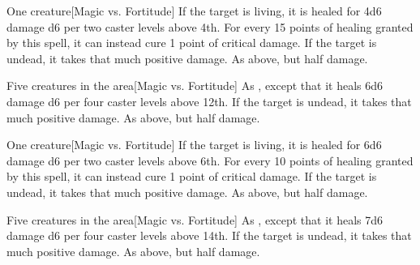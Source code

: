 \spellrng{\rngclose}
\begin{spelltarget}{One creature}[Magic vs. Fortitude]
    \spelleffect If the target is living, it is healed for 4d6 damage \add d6 per two caster levels above 4th. For every 15 points of healing granted by this spell, it can instead cure 1 point of critical damage.
    \spellsuccess If the target is undead, it takes that much positive damage.
    \spellfailure As above, but half damage.
\end{spelltarget}

\begin{spelltargets}{Five creatures in the area}[Magic vs. Fortitude]
    \spelleffect As , except that it heals 6d6 damage \add d6 per four caster levels above 12th.
    \spellsuccess If the target is undead, it takes that much positive damage.
    \spellfailure As above, but half damage.
\end{spelltargets}

\spellrng{\rngclose}
\begin{spelltarget}{One creature}[Magic vs. Fortitude]
    \spelleffect If the target is living, it is healed for 6d6 damage \add d6 per two caster levels above 6th. For every 10 points of healing granted by this spell, it can instead cure 1 point of critical damage.
    \spellsuccess If the target is undead, it takes that much positive damage.
    \spellfailure As above, but half damage.
\end{spelltarget}

\begin{spelltargets}{Five creatures in the area}[Magic vs. Fortitude]
    \spelleffect As , except that it heals 7d6 damage \add d6 per four caster levels above 14th.
    \spellsuccess If the target is undead, it takes that much positive damage.
    \spellfailure As above, but half damage.
\end{spelltargets}

